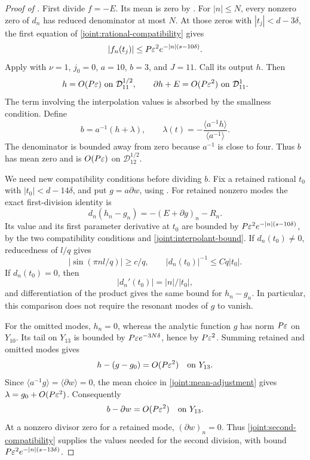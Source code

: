 \begin{proof}[Proof of ]
First divide \(f=-E\). Its mean is zero by
. For \(|n|\le N\), every nonzero zero of
\(d_n\) has reduced denominator at most \(N\). At those zeros with
\(|t_j|<d-3\delta\), the first equation of
\eqref{joint:rational-compatibility} gives
\[
 |f_n(t_j)|\le P\varepsilon^2e^{-|n|(s-10\delta)}.
\]
Apply  with
\(\nu=1\), \(j_0=0\), \(a=10\), \(b=3\), and \(J=11\).
Call its output \(h\). Then
\begin{equation}
 h=O(P\varepsilon)\ \hbox{on }\mathcal D_{11}^{1/2},\qquad
 \partial h+E=O(P\varepsilon^2)\ \hbox{on }\mathcal D_{11}^{1}.
 \label{joint:first-division}
\end{equation}
The term involving the interpolation values is absorbed by the
smallness condition. Define
\begin{equation}
 b=a^{-1}(h+\lambda),\qquad
 \lambda(t)=-\frac{\langle a^{-1}h\rangle}{\langle a^{-1}\rangle}.
 \label{joint:mean-adjustment}
\end{equation}
The denominator is bounded away from zero because \(a^{-1}\) is close
to four. Thus \(b\) has mean zero and is \(O(P\varepsilon)\) on
\(\mathcal D_{12}^{1/2}\).

We need new compatibility conditions before dividing \(b\). Fix a
retained rational \(t_0\) with \(|t_0|<d-14\delta\), and put
\(g=a\partial w\), using . For retained
nonzero modes the exact first-division identity is
\[
 d_n(h_n-g_n)=-(E+\partial g)_n-R_n.
\]
Its value and its first parameter derivative at \(t_0\) are bounded
by
\(P\varepsilon^2e^{-|n|(s-10\delta)}\), by the two compatibility conditions
and \eqref{joint:interpolant-bound}. If \(d_n(t_0)\ne0\), reducedness
of \(l/q\) gives
\[
 |\sin(\pi nl/q)|\ge c/q,
 \qquad |d_n(t_0)|^{-1}\le Cq|t_0|.
\]
If \(d_n(t_0)=0\), then
\[
 |d_n'(t_0)|=|n|/|t_0|,
\]
and differentiation of the product gives the same bound for
\(h_n-g_n\). In particular, this comparison does not require the
resonant modes of \(g\) to vanish.

For the omitted modes, \(h_n=0\), whereas the analytic function \(g\)
has norm \(P\varepsilon\) on \(Y_{10}\). Its tail on \(Y_{13}\) is bounded
by \(P\varepsilon e^{-3N\delta}\), hence by \(P\varepsilon^2\). Summing retained
and omitted modes gives
\[
 h-(g-g_0)=O(P\varepsilon^2)\quad\hbox{on }Y_{13}.
\]
Since \(\langle a^{-1}g\rangle=\langle\partial w\rangle=0\), the mean
choice in \eqref{joint:mean-adjustment} gives
\(\lambda=g_0+O(P\varepsilon^2)\). Consequently
\begin{equation}
 b-\partial w=O(P\varepsilon^2)\quad\hbox{on }Y_{13}.
 \label{joint:second-compatibility}
\end{equation}
At a nonzero divisor zero for a retained mode, \((\partial w)_n=0\).
Thus \eqref{joint:second-compatibility} supplies the values needed for
the second division, with bound
\(P\varepsilon^2e^{-|n|(s-13\delta)}\).


\end{proof}
